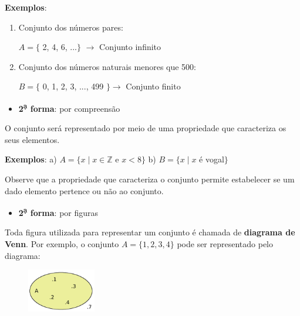\documentclass[11pt, openright, a4paper, brazil, english, french, spanish, bibjustif, openany, oneside]{abntex2}
\begin{document}
\begin{SingleSpace}
\textbf{Exemplos}: 



\begin{enumerate}[label=\alph*)]

\item Conjunto dos números pares:

$A=\{$ 2, 4, 6, ...$\}$ $\rightarrow$ Conjunto infinito

\item Conjunto dos números naturais menores que 500:

$B=\{$ 0, 1, 2, 3, ..., 499 $\}\rightarrow$ Conjunto finito

\end{enumerate}

\begin{itemize}

\item \textbf{2\textsuperscript{\d a} forma}: por compreensão

\end{itemize}

O conjunto será representado por meio de uma propriedade que caracteriza os seus elementos.

\textbf{Exemplos}: a) $A=\{ x \mid x \in \mathbb{Z}$ e $ x < 8\}$ \hspace{2cm} b) $B=\{ x \mid x$ é vogal$\}$

Observe que a propriedade que caracteriza o conjunto permite estabelecer se um dado elemento pertence ou não ao conjunto.

\begin{itemize}

\item \textbf{2\textsuperscript{\d a} forma}: por figuras

\end{itemize}

Toda figura utilizada para representar um conjunto é chamada de \textbf{diagrama de Venn}. Por exemplo, o conjunto $A=\{1, 2, 3, 4\}$ pode ser representado pelo diagrama:

\begin{minipage}{.4\linewidth}

\begin{figure}[H]
    
    \includegraphics[width=3cm]{diagramadevenn1.png}
   

\end{figure}
\end{minipage}
\end{SingleSpace}
\end{document}
